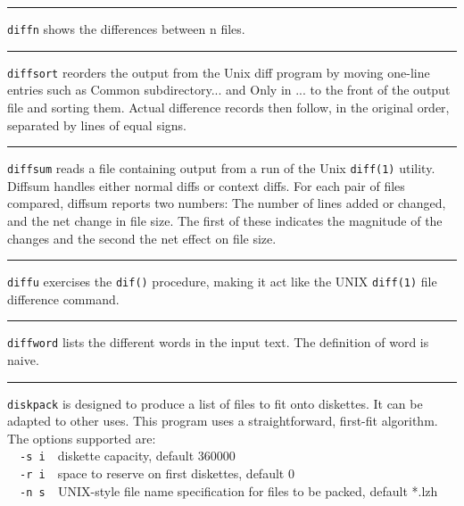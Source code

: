 {{{{{\vspace{0.25cm}\hrule{}

\texttt{diffn} shows the differences between n files.

\vspace{0.25cm}\hrule{}

\texttt{diffsort} reorders the output from the Unix
{\textquotedbl}diff{\textquotedbl} program by moving one-line entries
such as {\textquotedbl}Common subdirectory...{\textquotedbl} and
{\textquotedbl}Only in ...{\textquotedbl} to the front of the output
file and sorting them. Actual difference records then follow, in the
original order, separated by lines of equal signs. 

\vspace{0.25cm}\hrule{}

\texttt{diffsum} reads a file containing output from a run of the Unix
\texttt{diff(1)} utility. Diffsum handles either normal diffs or
context diffs. For each pair of files compared, diffsum reports two
numbers: The number of lines added or changed, and the net change in
file size. The first of these indicates the magnitude of the changes
and the second the net effect on file size. 

\vspace{0.25cm}\hrule{}

\texttt{diffu} exercises the \texttt{dif()} procedure, making it act
like the UNIX \texttt{diff(1)} file difference command.

\vspace{0.25cm}\hrule{}

\texttt{diffword} lists the different words in the input text. The
definition of {\textquotedbl}word{\textquotedbl} is naive. 

\vspace{0.25cm}\hrule{}

\texttt{diskpack} is designed to produce a list of files to fit onto
\index{diskettes}diskettes. It can be adapted to other uses. This
program uses a straightforward, first-fit algorithm. The options
supported are:\\
\ \ \texttt{{}-s i}\ \ diskette capacity, default 360000\\
\ \ \texttt{{}-r i}\ \ space to reserve on first diskettes, default
0\\
\ \ \texttt{{}-n s}\texttt{\ \ }UNIX-style file name specification for
files to be packed, default {\textquotedbl}*.lzh{\textquotedbl}

}}}}}
